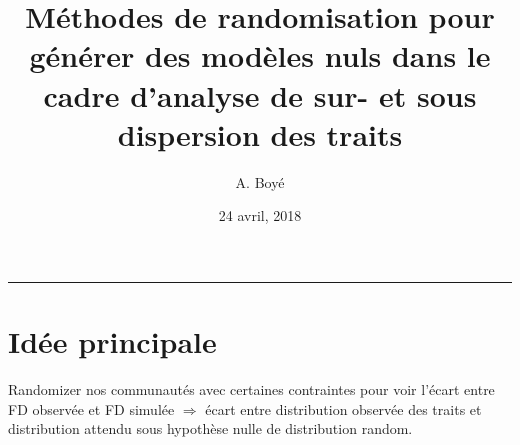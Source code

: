 \documentclass[]{article}
\title{Méthodes de randomisation pour générer des modèles nuls dans le cadre
d'analyse de sur- et sous dispersion des traits}
\author{A. Boyé}
\date{24 avril, 2018}
\begin{document}
\maketitle

{
\hypersetup{linkcolor=black}
\setcounter{tocdepth}{2}
\tableofcontents
}
\begin{center}\rule{0.5\linewidth}{\linethickness}\end{center}

\section{\texorpdfstring{ \textbf{Idée principale}
}{ Idée principale }}\label{idee-principale}

Randomizer nos communautés avec certaines contraintes pour voir l'écart
entre FD observée et FD simulée \(\Rightarrow\) écart entre distribution
observée des traits et distribution attendu sous hypothèse nulle de
distribution random.
\end{document}

